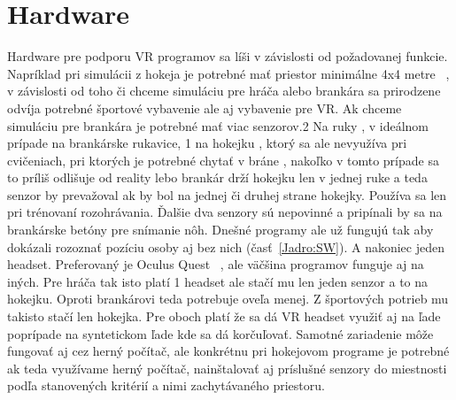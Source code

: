 \documentclass[10pt,twoside,slovak,a4paper]{article}										%
\begin{document}
\section{Hardware} \label{HW}
Hardware pre podporu VR programov sa líši v závislosti od požadovanej funkcie. Napríklad pri simulácii z hokeja je potrebné mať priestor minimálne 4x4 metre ~\cite{setuphk:zdroj}, v závislosti od toho či chceme simuláciu pre hráča alebo brankára sa prirodzene odvíja potrebné športové vybavenie ale aj vybavenie pre VR. Ak chceme simuláciu pre brankára je potrebné mať viac senzorov.2 Na ruky , v ideálnom prípade na brankárske rukavice, 1 na hokejku , ktorý sa ale nevyužíva pri cvičeniach, pri ktorých je potrebné chytať v bráne , nakoľko v tomto prípade sa to príliš odlišuje od reality lebo brankár drží hokejku len v jednej ruke a teda senzor by prevažoval ak by bol na jednej či druhej strane hokejky. Používa sa len pri trénovaní rozohrávania. Ďalšie dva senzory sú nepovinné a pripínali by sa na brankárske betóny pre snímanie nôh. Dnešné programy ale už fungujú tak aby dokázali rozoznať pozíciu osoby aj bez nich (časť~\ref{Jadro:SW}). A nakoniec jeden headset. Preferovaný je Oculus Quest ~\cite{headset:zdroj}, ale väčšina programov funguje aj na iných. Pre hráča tak isto platí 1 headset ale stačí mu len jeden senzor a to na hokejku. Oproti brankárovi teda potrebuje oveľa menej. Z športových potrieb mu takisto stačí len hokejka. Pre oboch platí že sa dá VR headset využiť aj na ľade poprípade na syntetickom ľade kde sa dá korčuľovať. Samotné zariadenie môže fungovať aj cez herný počítač, ale konkrétnu pri hokejovom programe je potrebné ak teda využívame herný počítač, nainštalovať aj príslušné senzory do miestnosti podľa stanovených kritérií a nimi zachytávaného priestoru.


%
\end{document}
